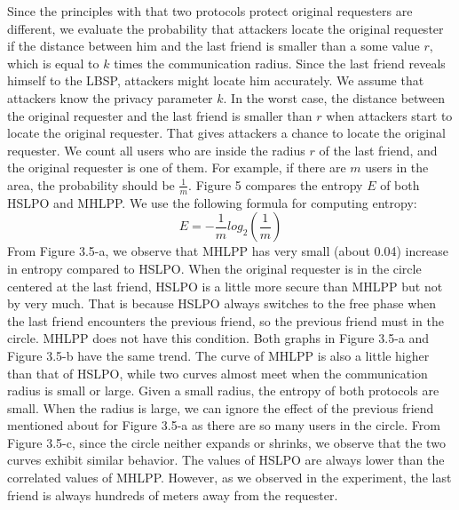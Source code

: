 \noindent Since the principles with that two protocols protect original requesters are different, we evaluate the probability that attackers locate the original requester if the distance between him and the last friend is smaller than a some value $r$, which is equal to $k$ times the communication radius. Since the last friend reveals himself to the LBSP, attackers might locate him accurately. We assume that attackers know the privacy parameter $k$. In the worst case, the distance between the original requester and the last friend is smaller than $r$ when attackers start to locate the original requester. That gives attackers a chance to locate the original requester. We count all users who are inside the radius $r$ of the last friend, and the original requester is one of them. For example, if there are $m$ users in the area, the probability should be $\frac{1}{m}$. Figure 5 compares the entropy $E$ of both HSLPO and MHLPP. We use the following formula for computing entropy:
\[E=-\frac{1}{m}{log}_2\left(\frac{1}{m}\right)\] 
From Figure 3.5-a, we observe that MHLPP has very small (about 0.04) increase in entropy compared to HSLPO. When the original requester is in the circle centered at the last friend, HSLPO is a little more secure than MHLPP but not by very much. That is because HSLPO always switches to the free phase when the last friend encounters the previous friend, so the previous friend must in the circle. MHLPP does not have this condition. Both graphs in Figure 3.5-a and Figure 3.5-b have the same trend. The curve of MHLPP is also a little higher than that of HSLPO, while two curves almost meet when the communication radius is small or large. Given a small radius, the entropy of both protocols are small. When the radius is large, we can ignore the effect of the previous friend mentioned about for Figure 3.5-a as there are so many users in the circle. From Figure 3.5-c, since the circle neither expands or shrinks, we observe that the two curves exhibit similar behavior. The values of HSLPO are always lower than the correlated values of MHLPP. However, as we observed in the experiment, the last friend is always hundreds of meters away from the requester. 



